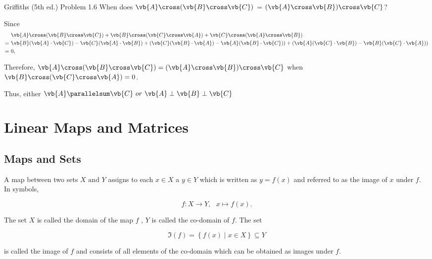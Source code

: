 \documentclass[a4paper,12pt]{report}
\begin{document}
\example
{Griffiths (5th ed.) Problem 1.6}
{When does \(\vb{A} \cross (\vb{B} \cross \vb{C})\) = \((\vb{A} \cross \vb{B}) \cross \vb{C}\)?}
{Since
\begin{equation}
	\begin{aligned}
		&\vb{A} \cross (\vb{B} \cross \vb{C}) + \vb{B} \cross (\vb{C} \cross \vb{A}) + \vb{C} \cross (\vb{A} \cross \vb{B}) \\
		= ~&\vb{B}(\vb{A} \cdot \vb{C}) - \vb{C}(\vb{A} \cdot \vb{B}) + (\vb{C}(\vb{B} \cdot \vb{A}) - \vb{A}(\vb{B} \cdot \vb{C})) + (\vb{A}(\vb{C} \cdot \vb{B}) - \vb{B}(\vb{C} \cdot \vb{A})) \\
		= ~&0,
	\end{aligned}
\end{equation}

Therefore, \(\vb{A} \cross (\vb{B} \cross \vb{C}) = (\vb{A} \cross \vb{B}) \cross \vb{C}\) when \(\vb{B} \cross (\vb{C} \cross \vb{A}) = 0\).

Thus, either \(\vb{A} \parallelsum \vb{C} ~ or ~ \vb{A} \perp \vb{B} \perp \vb{C}\)}


\chapter{Linear Maps and Matrices}

\section{Maps and Sets}

\begin{definition}
A map between two sets \(X \text { and } Y\) assigns to each \(x \in  X \) a \(y \in Y\) which is written as \(y=f(x)\) and referred to as the image of \(x\) under \(f\). In symbols, 

\begin{equation}
    f:X \rightarrow Y,~~~  x \mapsto f(x).
\end{equation}

The set \(X\) is called the domain of the map \(f\) , \(Y\) is called the co-domain of \(f\). The set 

\begin{equation}
    \Im (f) = \left\{ f(x) \mid x \in  X \right\} \subseteq Y
\end{equation}

is called the image of \(f\) and consists of all elements of the co-domain which can be obtained as images under \(f\). 


\end{definition}
\end{document}
